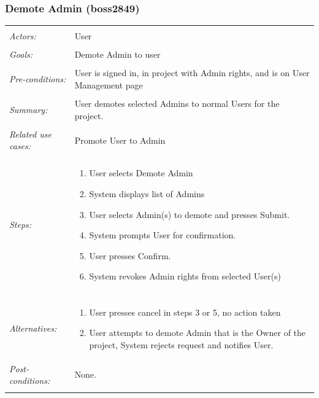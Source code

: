 \documentclass[11pt]{article}
\begin{document}
\subsubsection{Demote Admin  (boss2849)}
\begin{tabular}{ p{2cm} p{12cm} }
 \hline
 \\
 \textit{Actors:} & User \\ 
 \\
 \textit{Goals:} & Demote Admin to user \\
 \\
 \textit{Pre-conditions:} & User is signed in, in project with Admin rights, and is on User Management page \\
 \\
 \textit{Summary:} & User demotes selected Admins to normal Users for the project. \\ 
 \\
 \textit{Related use cases:} & Promote User to Admin \\ 
 \\
 \textit{Steps:} & \begin{enumerate}
  \item User selects Demote Admin
  \item System displays list of Admins
  \item User selects Admin(s) to demote and presses Submit.
  \item System prompts User for confirmation.
  \item User presses Confirm.
  \item System revokes Admin rights from selected User(s)
 \end{enumerate} \\
 \\
 \textit{Alternatives:} & \begin{enumerate}
  \item User presses cancel in steps 3 or 5, no action taken
  \item User attempts to demote Admin that is the Owner of the project, System rejects request and notifies User.
 \end{enumerate}
 \\
 \textit{Post-conditions:} & None. \\
 \\
\hline
\end{tabular}
\end{document}
